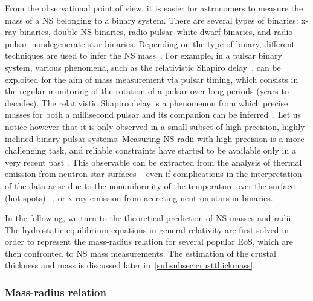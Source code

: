 From the observational point of view, it is easier for astronomers to measure 
the mass of a NS belonging to a binary system. There are several types of
binaries: x-ray binaries, double NS binaries, radio pulsar--white dwarf 
binaries, and radio pulsar--nondegenerate star binaries. Depending on the type 
of binary, different techniques are used to infer the NS 
mass~\cite{Haensel2007}.
For example, in a pulsar binary system, various phenomena, such as the 
relativistic Shapiro delay~\cite{Shapiro1964}, can be exploited for the aim of
mass measurement via pulsar 
timing, which consists in the regular monitoring of the rotation of a pulsar 
over long periods (years to decades). The relativistic Shapiro delay is a 
phenomenon from which precise masses for both a millisecond pulsar and its 
companion can be inferred~\cite{Demorest2010,Cromartie2020}. Let us notice 
however that it is only observed in a small subset of high-precision, highly 
inclined binary pulsar systems. 
Measuring NS radii with high precision is a more challenging task, and reliable
constraints have started to be available only in a very recent 
past \cite{Bogdanov2019a,Bogdanov2019b,Miller2019,Raaijmakers2019,Riley2019}. 
This observable can be extracted from the analysis of thermal emission from 
neutron star surfaces -- even if complications in the interpretation of the data
arise due to the nonuniformity of the temperature over the surface (hot
spots) \cite{Bogdanov2019a,Bogdanov2019b,Miller2019,Raaijmakers2019,Riley2019}
--, or x-ray emission from accreting neutron stars in binaries.

In the following, we turn to the theoretical prediction of NS masses and radii. 
The hydrostatic equilibrium equations in general relativity are first solved in 
order to represent the mass-radius relation for several popular EoS, which are
then confronted to NS mass measurements. The estimation of the crustal 
thickness and mass is discussed later in~\ref{subsubsec:crustthickmass}.

\subsubsection{Mass-radius relation}


